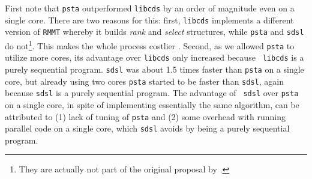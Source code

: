 First note that {\tt psta} outperformed {\tt libcds} by an order of
magnitude even on a single core. There are two reasons for this:
first, \verb+libcds+ implements a different version of \verb+RMMT+
whereby it builds {\em rank} and {\em select} structures, while
\verb+psta+ and \verb+sdsl+ do not\footnote{They are actually not part
  of the original proposal by
  \cite{Navarro:2014:FFS:2620785.2601073}.}. This makes the whole
process costlier . Second, as we allowed {\tt psta} to utilize more
cores, its advantage over {\tt libcds} only increased because {\tt
  libcds} is a purely sequential program.  {\tt sdsl} was about 1.5
times faster than {\tt psta} on a single core, but already using two
cores {\tt psta} started to be faster than {\tt sdsl}, again because
{\tt sdsl} is a purely sequential program.  The advantage of {\tt
  sdsl} over {\tt psta} on a single core, in spite of implementing
essentially the same algorithm, can be attributed to (1) lack of
tuning of {\tt psta} and (2) some overhead with running parallel code
on a single core, which {\tt sdsl} avoids by being a purely sequential
program.
%
